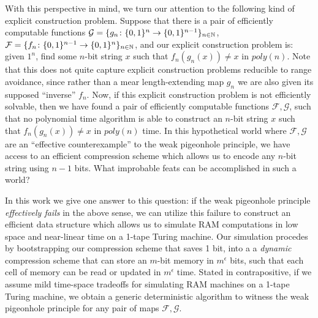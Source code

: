 With this perspective in mind, we turn our attention to the following kind of explicit construction problem. Suppose that there is a pair of efficiently computable functions  $\mathcal{G} = \{g_n \colon \{0,1\}^{n} \rightarrow \{0,1\}^{n-1}\}_{n \in \mathbb{N}}$, $\mathcal{F} = \{f_n \colon \{0,1\}^{n-1} \rightarrow \{0,1\}^n\}_{n \in \mathbb{N}}$, and our explicit construction problem is: given $1^n$, find some $n$-bit string $x$ such that $f_n(g_n(x)) \neq x$ in $poly(n)$. Note that this does not quite capture explicit construction problems reducible to range avoidance, since rather than a mear length-extending map $g_n$ we are also given its supposed ``inverse'' $f_n$. Now, if this explicit construction problem is not efficiently solvable, then we have found a pair of efficiently computable functions $\mathcal{F}, \mathcal{G}$, such that no polynomial time algorithm is able to construct an $n$-bit string $x$ such that $f_n(g_n(x)) \neq x$ in $poly(n)$ time. 
In this hypothetical world where $\mathcal{F}, \mathcal{G}$ are an ``effective counterexample'' to the weak pigeonhole principle, we have access to an efficient compression scheme which allows us to encode any $n$-bit string using $n-1$ bits. What improbable feats can be accomplished in such a world? 

In this work we give one answer to this question: if the weak pigeonhole principle \emph{effectively fails} in the above sense, we can utilize this failure to construct an efficient data structure which allows us to simulate RAM computations in low space and near-linear time on a 1-tape Turing machine. Our simulation procedes by bootstrapping our compression scheme that saves 1 bit, into a a \emph{dynamic} compression scheme that can store an $m$-bit memory in $m^{\epsilon}$ bits, such that each cell of memory can be read or updated in $m^{\epsilon}$ time. 
Stated in contrapositive, if we assume mild time-space tradeoffs for simulating RAM machines on a 1-tape Turing machine, we obtain a generic deterministic algorithm to witness the weak pigeonhole principle for any pair of maps  $\mathcal{F}, \mathcal{G}$. 


